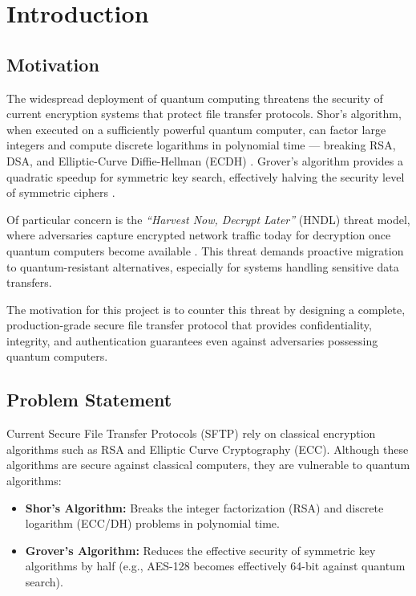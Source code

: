 \chapter{Introduction} 
\label{chap.1}

\section{Motivation}

The widespread deployment of quantum computing threatens the security of current encryption systems that protect file transfer protocols. Shor's algorithm, when executed on a sufficiently powerful quantum computer, can factor large integers and compute discrete logarithms in polynomial time — breaking RSA, DSA, and Elliptic-Curve Diffie-Hellman (ECDH) \cite{shor1994algorithms}. Grover's algorithm provides a quadratic speedup for symmetric key search, effectively halving the security level of symmetric ciphers \cite{grover1996fast}.

Of particular concern is the \textit{``Harvest Now, Decrypt Later''} (HNDL) threat model, where adversaries capture encrypted network traffic today for decryption once quantum computers become available \cite{mosca2018cybersecurity}. This threat demands proactive migration to quantum-resistant alternatives, especially for systems handling sensitive data transfers.

The motivation for this project is to counter this threat by designing a complete, production-grade secure file transfer protocol that provides confidentiality, integrity, and authentication guarantees even against adversaries possessing quantum computers.

\section{Problem Statement}

Current Secure File Transfer Protocols (SFTP) rely on classical encryption algorithms such as RSA and Elliptic Curve Cryptography (ECC). Although these algorithms are secure against classical computers, they are vulnerable to quantum algorithms:

\begin{itemize}
    \item \textbf{Shor's Algorithm:} Breaks the integer factorization (RSA) and discrete logarithm (ECC/DH) problems in polynomial time.
    \item \textbf{Grover's Algorithm:} Reduces the effective security of symmetric key algorithms by half (e.g., AES-128 becomes effectively 64-bit against quantum search).
\end{itemize}

